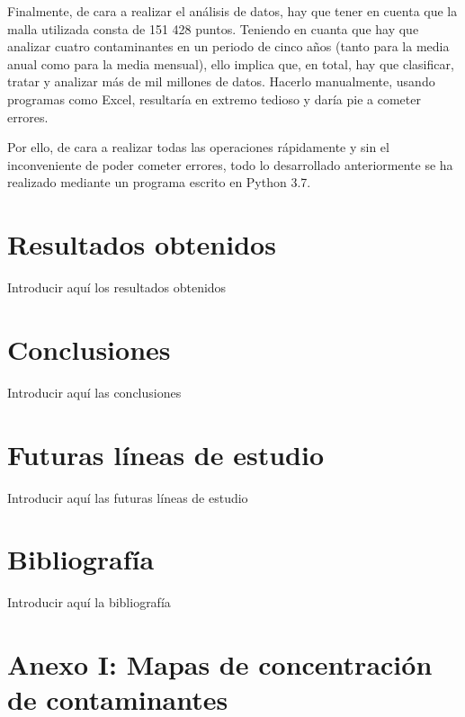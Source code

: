 \documentclass[12pt]{article}
\begin{document}
Finalmente, de cara a realizar el análisis de datos, hay que tener en cuenta que la malla utilizada consta de 151 428 puntos. Teniendo en cuanta que hay que analizar cuatro contaminantes en un periodo de cinco años (tanto para la media anual como para la media mensual), ello implica que, en total, hay que clasificar, tratar y analizar más de mil millones de datos. Hacerlo manualmente, usando programas como Excel, resultaría en extremo tedioso y daría pie a cometer errores.

Por ello, de cara a realizar todas las operaciones rápidamente y sin el inconveniente de poder cometer errores, todo lo desarrollado anteriormente se ha realizado mediante un programa escrito en Python 3.7.

\newpage

\section{Resultados obtenidos}

Introducir aquí los resultados obtenidos

\newpage

\section{Conclusiones}

Introducir aquí las conclusiones

\newpage

\section{Futuras líneas de estudio}

Introducir aquí las futuras líneas de estudio

\newpage

\section{Bibliografía}

Introducir aquí la bibliografía

\newpage



\section*{Anexo I: Mapas de concentración de contaminantes}
%
\end{document}
